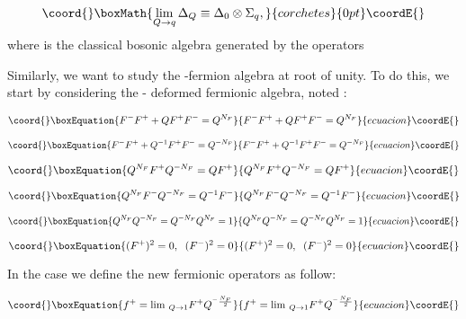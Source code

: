 \documentclass[a4paper,12pt,thmsa]{article}
\begin{document}
\[\coord{}\boxMath{
\lim_{Q\rightarrow q}\Delta _Q\equiv \Delta _0\otimes \Sigma _q,
}{corchetes}{0pt}\coordE{}\]
where \coordHE{} is the classical bosonic algebra generated by the
operators \coordHE{}  \coordHE{}

Similarly, we want to study the \coordHE{}-fermion algebra at root of unity. To do
this, we start by considering the \coordHE{}- deformed fermionic algebra, noted \coordHE{}:

\begin{equation}\coord{}\boxEquation{
F^{-}F^{+}+QF^{+}F^{-}=Q^{N_{F}}
}{
F^{-}F^{+}+QF^{+}F^{-}=Q^{N_{F}}
}{ecuacion}\coordE{}\end{equation}

\begin{equation}\coord{}\boxEquation{
F^{-}F^{+}+Q^{-1}F^{+}F^{-}=Q^{-N_F}
}{
F^{-}F^{+}+Q^{-1}F^{+}F^{-}=Q^{-N_F}
}{ecuacion}\coordE{}\end{equation}

\begin{equation}\coord{}\boxEquation{
Q^{N_F}F^{+}Q^{-N_F}=QF^{+}
}{
Q^{N_F}F^{+}Q^{-N_F}=QF^{+}
}{ecuacion}\coordE{}\end{equation}

\begin{equation}\coord{}\boxEquation{
Q^{N_F}F^{-}Q^{-N_F}=Q^{-1}F^{-}
}{
Q^{N_F}F^{-}Q^{-N_F}=Q^{-1}F^{-}
}{ecuacion}\coordE{}\end{equation}

\begin{equation}\coord{}\boxEquation{
Q^{N_F}Q^{-N_F}=Q^{-N_F}Q^{N_F}=1
}{
Q^{N_F}Q^{-N_F}=Q^{-N_F}Q^{N_F}=1
}{ecuacion}\coordE{}\end{equation}

\begin{equation}\coord{}\boxEquation{
(F^{+})^2=0, \; \; (F^{-})^2=0
}{
(F^{+})^2=0, \; \; (F^{-})^2=0
}{ecuacion}\coordE{}\end{equation}

In the case \coordHE{}  \coordHE{} we define the new fermionic operators as follow:

\begin{equation}\coord{}\boxEquation{
f^{+}=\lim \, _{Q\rightarrow 1}F^{+}Q^{^{-}\frac{N_F}2}
}{
f^{+}=\lim \, _{Q\rightarrow 1}F^{+}Q^{^{-}\frac{N_F}2}
}{ecuacion}\coordE{}\end{equation}
\end{document}

